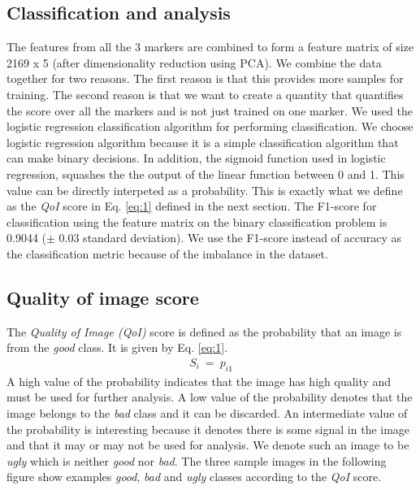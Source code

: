\subsection{Classification and analysis}
The features from all the 3 markers are combined to form a feature matrix of size 2169 x 5 (after dimensionality reduction using PCA). We combine the data together for two reasons. The first reason is that this provides more samples for training. The second reason is that we want to create a quantity that quantifies the score over all the markers and is not just trained on one marker. 
We used the logistic regression classification algorithm for performing classification. We choose logistic regression algorithm because it is a simple classification algorithm that can make binary decisions. In addition, the sigmoid function used in logistic regression, squashes the the output of the linear function between 0 and 1. This value can be directly interpeted as a probability. This is exactly what we define as the \textit{QoI} score in Eq. \ref{eq:1} defined in the next section.
The F1-score for classification using the feature matrix on the binary classification problem is 0.9044 ($\pm$  0.03 standard deviation). We use the F1-score instead of accuracy as the classification metric because of the imbalance in the dataset.

\subsection{Quality of image score}
The \textit{Quality of Image (QoI)} score is defined as the probability that an image is from the \textit{good} class. It is given by Eq. \ref{eq:1}.
\begin{equation}
\begin{gathered} 
S_i \ =  \ p_{i1} 
\end{gathered}
\label{eq:1}
\end{equation}
A high value of the probability indicates that the image has high quality and must be used for further analysis. A low value of the probability denotes that the image belongs to the \textit{bad} class and it can be discarded. An intermediate value of the probability is interesting because it denotes there is some signal in the image and that it may or may not be used for analysis. We denote such an image to be \textit{ugly} which is neither \textit{good} nor \textit{bad}.
 The three sample images in the following figure show examples \textit{good}, \textit{bad} and \textit{ugly} classes according to the \textit{QoI} score. 

